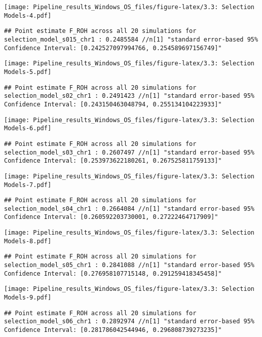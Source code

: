 \documentclass[
]{article}
\begin{document}
\texttt{[image: Pipeline\_results\_Windows\_OS\_files/figure-latex/3.3: Selection Models-4.pdf]}

\begin{verbatim}
## Point estimate F_ROH across all 20 simulations for  selection_model_s015_chr1 : 0.2485584 //n[1] "standard error-based 95% Confidence Interval: [0.242527097994766, 0.254589697156749]"
\end{verbatim}

\texttt{[image: Pipeline\_results\_Windows\_OS\_files/figure-latex/3.3: Selection Models-5.pdf]}

\begin{verbatim}
## Point estimate F_ROH across all 20 simulations for  selection_model_s02_chr1 : 0.2491423 //n[1] "standard error-based 95% Confidence Interval: [0.243150463048794, 0.255134104223933]"
\end{verbatim}

\texttt{[image: Pipeline\_results\_Windows\_OS\_files/figure-latex/3.3: Selection Models-6.pdf]}

\begin{verbatim}
## Point estimate F_ROH across all 20 simulations for  selection_model_s03_chr1 : 0.2607497 //n[1] "standard error-based 95% Confidence Interval: [0.253973622180261, 0.267525811759133]"
\end{verbatim}

\texttt{[image: Pipeline\_results\_Windows\_OS\_files/figure-latex/3.3: Selection Models-7.pdf]}

\begin{verbatim}
## Point estimate F_ROH across all 20 simulations for  selection_model_s04_chr1 : 0.2664084 //n[1] "standard error-based 95% Confidence Interval: [0.260592203730001, 0.27222464717909]"
\end{verbatim}

\texttt{[image: Pipeline\_results\_Windows\_OS\_files/figure-latex/3.3: Selection Models-8.pdf]}

\begin{verbatim}
## Point estimate F_ROH across all 20 simulations for  selection_model_s05_chr1 : 0.2841088 //n[1] "standard error-based 95% Confidence Interval: [0.276958107715148, 0.291259418345458]"
\end{verbatim}

\texttt{[image: Pipeline\_results\_Windows\_OS\_files/figure-latex/3.3: Selection Models-9.pdf]}

\begin{verbatim}
## Point estimate F_ROH across all 20 simulations for  selection_model_s06_chr1 : 0.2892974 //n[1] "standard error-based 95% Confidence Interval: [0.281786042544946, 0.296808739273235]"
\end{verbatim}
\end{document}
